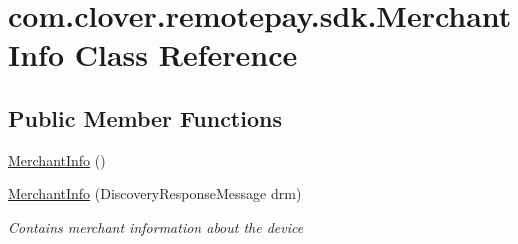 \hypertarget{classcom_1_1clover_1_1remotepay_1_1sdk_1_1_merchant_info}{}\section{com.\+clover.\+remotepay.\+sdk.\+Merchant\+Info Class Reference}
\label{classcom_1_1clover_1_1remotepay_1_1sdk_1_1_merchant_info}
\subsection*{Public Member Functions}
\begin{DoxyCompactItemize}
\item 
\hyperlink{classcom_1_1clover_1_1remotepay_1_1sdk_1_1_merchant_info_a1a022bc105ba4712d9371e058ca49415}{Merchant\+Info} ()
\item 
\hyperlink{classcom_1_1clover_1_1remotepay_1_1sdk_1_1_merchant_info_a844b6e42945c5909c8c76e4473de5d90}{Merchant\+Info} (Discovery\+Response\+Message drm)
\begin{DoxyCompactList}\small\item\em Contains merchant information about the device \end{DoxyCompactList}\end{DoxyCompactItemize}
